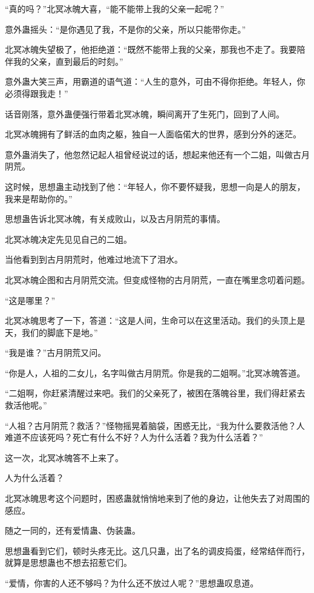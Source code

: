 \begin{this_body}
“真的吗？”北冥冰魄大喜，“能不能带上我的父亲一起呢？”

意外蛊摇头：“是你遇见了我，不是你的父亲，所以只能带你走。”

北冥冰魄失望极了，他拒绝道：“既然不能带上我的父亲，那我也不走了。我要陪伴我的父亲，直到最后的时刻。”

意外蛊大笑三声，用霸道的语气道：“人生的意外，可由不得你拒绝。年轻人，你必须得跟我走！”

话音刚落，意外蛊便强行带着北冥冰魄，瞬间离开了生死门，回到了人间。

北冥冰魄拥有了鲜活的血肉之躯，独自一人面临偌大的世界，感到分外的迷茫。

意外蛊消失了，他忽然记起人祖曾经说过的话，想起来他还有一个二姐，叫做古月阴荒。

这时候，思想蛊主动找到了他：“年轻人，你不要怀疑我，思想一向是人的朋友，我来是帮助你的。”

思想蛊告诉北冥冰魄，有关成败山，以及古月阴荒的事情。

北冥冰魄决定先见见自己的二姐。

当他看到到古月阴荒时，他难过地流下了泪水。

北冥冰魄企图和古月阴荒交流。但变成怪物的古月阴荒，一直在嘴里念叨着问题。

“这是哪里？”

北冥冰魄思考了一下，答道：“这是人间，生命可以在这里活动。我们的头顶上是天，我们的脚底下是地。”

“我是谁？”古月阴荒又问。

“你是人，人祖的二女儿，名字叫做古月阴荒。你是我的二姐啊。”北冥冰魄答道。

“二姐啊，你赶紧清醒过来吧。我们的父亲死了，被困在落魄谷里，我们得赶紧去救活他呢。”

“人祖？古月阴荒？救活？”怪物摇晃着脑袋，困惑无比，“我为什么要救活他？人难道不应该死吗？死亡有什么不好？人为什么活着？我为什么活着？”

这一次，北冥冰魄答不上来了。

人为什么活着？

北冥冰魄思考这个问题时，困惑蛊就悄悄地来到了他的身边，让他失去了对周围的感应。

随之一同的，还有爱情蛊、伪装蛊。

思想蛊看到它们，顿时头疼无比。这几只蛊，出了名的调皮捣蛋，经常结伴而行，就算是思想蛊也不想去招惹它们。

“爱情，你害的人还不够吗？为什么还不放过人呢？”思想蛊叹息道。


\end{this_body}
